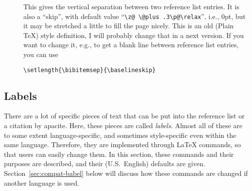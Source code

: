 \documentclass{article}
\newcommand{\pkg}[1]{\textsf{#1}}%
\newcommand{\cmd}[1]{\texttt{\string#1}}%
\begin{document}
\begin{description}
  \item[\cmd{\bibitemsep}] This gives the vertical separation
      between two reference list entries. It is also a ``skip'', with
      default value ``\verb+\z@ \@plus .3\p@\relax+'', i.e., 0pt,
      but it may be stretched a little to fill the page nicely.
      This is an old (Plain \TeX) style definition, I will probably
      change that in a next version. If you want to change it,
      e.g., to get a blank line between reference list entries,
      you can use
\begin{verbatim}
\setlength{\bibitemsep}{\baselineskip}
\end{verbatim}
\end{description}

\subsection{Labels}
\label{sec:labels}
There are a lot of specific pieces of text that can be put into the reference
list or a citation by \pkg{apacite}. Here, these pieces are called
\emph{labels}. Almost all of these are to some extent language-specific, and
sometimes style-specific even within the same language. Therefore, they are
implemented through \LaTeX{} commands, so that users can easily change them.
In this section, these commands and their purposes are described, and their
(U.S.\ English) defaults are given. Section~\ref{sec:compat-babel} below will
discuss how these commands are changed if another language is used.
\end{document}
